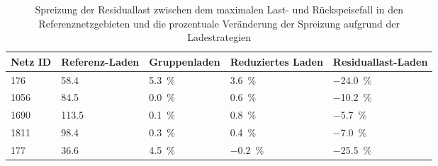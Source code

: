 {
\renewcommand{\arraystretch}{1.2}%
\begin{table}[H]
	\begin{center}
		\caption{Spreizung der Residuallast zwischen dem maximalen Last- und Rückspeisefall in den Referenznetzgebieten und die prozentuale Veränderung der Spreizung aufgrund der Ladestrategien}
		\begin{tabu} to \textwidth {X[0.5] X[1, r] X[1, r] X[1.2, r] X[1.2, r]}
			\toprule
			Netz ID    & Referenz-Laden  & Gruppenladen                              & Reduziertes Laden                          & Residuallast-Laden                         \\ \midrule
			\num{176}  & \SI{58.4}{\mw}  & \SI[retain-explicit-plus]{+5.3}{\percent} & \SI[retain-explicit-plus]{+3.6}{\percent}  & \SI[retain-explicit-plus]{-24.0}{\percent} \\
			\num{1056} & \SI{84.5}{\mw}  & \SI[retain-explicit-plus]{+0.0}{\percent} & \SI[retain-explicit-plus]{+0.6}{\percent}  & \SI[retain-explicit-plus]{-10.2}{\percent} \\
			\num{1690} & \SI{113.5}{\mw} & \SI[retain-explicit-plus]{+0.1}{\percent} & \SI[retain-explicit-plus]{+0.8}{\percent}  & \SI[retain-explicit-plus]{-5.7}{\percent}  \\
			\num{1811} & \SI{98.4}{\mw}  & \SI[retain-explicit-plus]{+0.3}{\percent} & \SI[retain-explicit-plus]{+0.4}{\percent}  & \SI[retain-explicit-plus]{-7.0}{\percent}  \\
			\num{177}  & \SI{36.6}{\mw}  & \SI[retain-explicit-plus]{+4.5}{\percent} & \SI[retain-explicit-plus]{-0.2}{\percent}  & \SI[retain-explicit-plus]{-25.5}{\percent} \\ \bottomrule
		\end{tabu}
		\label{tab:ResidualLoadSpread}
	\end{center}
	\vspace{-3mm}%
\end{table}
}